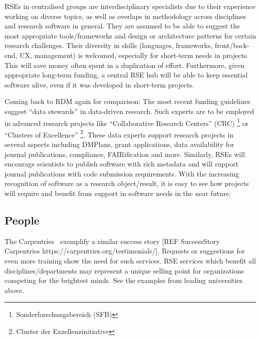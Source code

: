 \documentclass[a4paper]{article}
\begin{document}
RSEs in centralised groups are interdisciplinary specialists due to their experience working on diverse topics, as well as overlaps in methodology across disciplines and research software in general.
They are assumed to be able to suggest the most appropriate tools/frameworks and design or architecture patterns for certain research challenges.
Their diversity in skills (languages, frameworks, front/back-end, UX, management) is welcomed, especially for short-term needs in projects.
This will save money often spent in a duplication of effort.
Furthermore, given appropriate long-term funding, a central RSE hub will be able to keep essential software alive, even if it was developed in short-term projects.


Coming back to RDM again for comparison: The most recent funding guidelines suggest “data stewards” in data-driven research.
Such experts are to be employed in advanced research projects like “Collaborative Research Centers” (CRC) \footnote{Sonderforschungsbereich (SFB)} or “Clusters of Excellence”
\footnote{Cluster der Exzellenzinitiative}.
These data experts support research projects in several aspects including DMPlans, grant applications, data availability for journal publications, compliance, FAIRification and more.
Similarly, RSEs will encourage scientists to publish software with rich metadata and will support journal publications with code submission requirements.
With the increasing recognition of software as a research object/result, it is easy to see how projects will require and benefit from support in software needs in the near future.




\subsection{People}



The Carpentries~\autocite{Carpentries} exemplify a similar success story [REF SuccessStory Carpentries https://carpentries.org/testimonials/]. Requests or suggestions for even more training show the need for such services.
RSE services which benefit all disciplines/departments may represent a unique selling point for organizations competing for the brightest minds.
See the examples from leading universities above.
\end{document}
